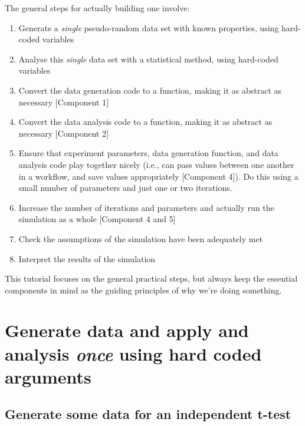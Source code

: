 \documentclass[
]{article}
\providecommand{\tightlist}{%
  \setlength{\itemsep}{0pt}\setlength{\parskip}{0pt}}
\begin{document}
The general steps for actually building one involve:

\begin{enumerate}
\def\labelenumi{\arabic{enumi}.}
\tightlist
\item
  Generate a \emph{single} pseudo-random data set with known properties,
  using hard-coded variables
\item
  Analyse this \emph{single} data set with a statistical method, using
  hard-coded variables
\item
  Convert the data generation code to a function, making it as abstract
  as necessary {[}Component 1{]}
\item
  Convert the data analysis code to a function, making it as abstract as
  necessary {[}Component 2{]}
\item
  Ensure that experiment parameters, data generation function, and data
  analysis code play together nicely (i.e., can pass values between one
  another in a workflow, and save values appropriately {[}Component
  4{]}). Do this using a small number of parameters and just one or two
  iterations.
\item
  Increase the number of iterations and parameters and actually run the
  simulation as a whole {[}Component 4 and 5{]}
\item
  Check the assumptions of the simulation have been adequately met
\item
  Interpret the results of the simulation
\end{enumerate}

This tutorial focuses on the general practical steps, but always keep
the essential components in mind as the guiding principles of why we're
doing something.

\hypertarget{generate-data-and-apply-and-analysis-once-using-hard-coded-arguments}{%
\section{\texorpdfstring{Generate data and apply and analysis
\emph{once} using hard coded
arguments}{Generate data and apply and analysis once using hard coded arguments}}\label{generate-data-and-apply-and-analysis-once-using-hard-coded-arguments}}

\hypertarget{generate-some-data-for-an-independent-t-test}{%
\subsection{Generate some data for an independent
t-test}\label{generate-some-data-for-an-independent-t-test}}
\end{document}
